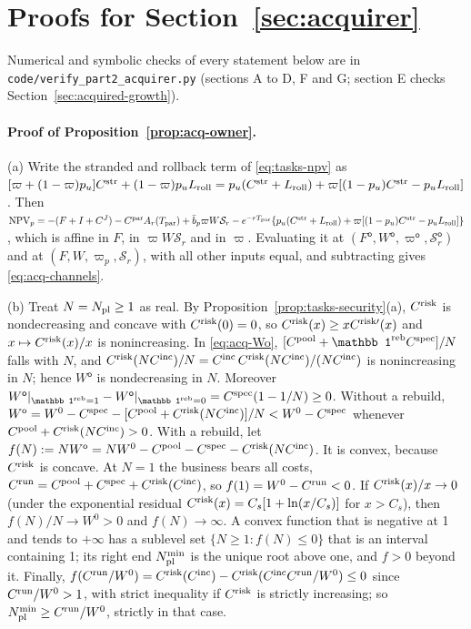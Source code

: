 \section{Proofs for Section~\ref{sec:acquirer}}\label{app:proofs-acquirer}

Numerical and symbolic checks of every statement below are in \texttt{code/verify\_part2\_acquirer.py} (sections A to D, F and G; section E checks Section~\ref{sec:acquired-growth}).

\paragraph{Proof of Proposition~\ref{prop:acq-owner}.}
(a) Write the stranded and rollback term of \eqref{eq:tasks-npv} as $[\varpi+(1-\varpi)p_u]C^{\rm str}+(1-\varpi)p_uL_{\rm roll}=p_u(C^{\rm str}+L_{\rm roll})+\varpi[(1-p_u)C^{\rm str}-p_uL_{\rm roll}]$. Then $\mathrm{NPV}_p=-(F+I+C^J)-C^{\rm par}A_r(T_{\rm par})+\bar b_p\varpi W\mathcal S_r-e^{-rT_{\rm par}}\{p_u(C^{\rm str}+L_{\rm roll})+\varpi[(1-p_u)C^{\rm str}-p_uL_{\rm roll}]\}$, which is affine in $F$, in $\varpi W\mathcal S_r$ and in $\varpi$. Evaluating it at $(F^{\mathsf o},W^{\mathsf o},\varpi^{\mathsf o},\mathcal S^{\mathsf o}_r)$ and at $(F,W,\varpi_p,\mathcal S_r)$, with all other inputs equal, and subtracting gives \eqref{eq:acq-channels}.

(b) Treat $N=N_{\rm pl}\ge1$ as real. By Proposition~\ref{prop:tasks-security}(a), $C^{\rm risk}$ is nondecreasing and concave with $C^{\rm risk}(0)=0$, so $C^{\rm risk}(x)\ge xC^{\rm risk\prime}(x)$ and $x\mapsto C^{\rm risk}(x)/x$ is nonincreasing. In \eqref{eq:acq-Wo}, $[C^{\rm pool}+\mathbb 1^{\rm reb}C^{\rm spec}]/N$ falls with $N$, and $C^{\rm risk}(NC^{\rm inc})/N=C^{\rm inc}\,C^{\rm risk}(NC^{\rm inc})/(NC^{\rm inc})$ is nonincreasing in $N$; hence $W^{\mathsf o}$ is nondecreasing in $N$. Moreover $W^{\mathsf o}|_{\mathbb 1^{\rm reb}=1}-W^{\mathsf o}|_{\mathbb 1^{\rm reb}=0}=C^{\rm spec}(1-1/N)\ge0$. Without a rebuild, $W^{\mathsf o}=W^0-C^{\rm spec}-[C^{\rm pool}+C^{\rm risk}(NC^{\rm inc})]/N<W^0-C^{\rm spec}$ whenever $C^{\rm pool}+C^{\rm risk}(NC^{\rm inc})>0$. With a rebuild, let $f(N):=NW^{\mathsf o}=NW^0-C^{\rm pool}-C^{\rm spec}-C^{\rm risk}(NC^{\rm inc})$. It is convex, because $C^{\rm risk}$ is concave. At $N=1$ the business bears all costs, $C^{\rm run}=C^{\rm pool}+C^{\rm spec}+C^{\rm risk}(C^{\rm inc})$, so $f(1)=W^0-C^{\rm run}<0$. If $C^{\rm risk}(x)/x\to0$ (under the exponential residual $C^{\rm risk}(x)=C_s[1+\ln(x/C_s)]$ for $x>C_s$), then $f(N)/N\to W^0>0$ and $f(N)\to\infty$. A convex function that is negative at 1 and tends to $+\infty$ has a sublevel set $\{N\ge1:f(N)\le0\}$ that is an interval containing 1; its right end $N^{\min}_{\rm pl}$ is the unique root above one, and $f>0$ beyond it. Finally, $f(C^{\rm run}/W^0)=C^{\rm risk}(C^{\rm inc})-C^{\rm risk}(C^{\rm inc}C^{\rm run}/W^0)\le0$ since $C^{\rm run}/W^0>1$, with strict inequality if $C^{\rm risk}$ is strictly increasing; so $N^{\min}_{\rm pl}\ge C^{\rm run}/W^0$, strictly in that case.

